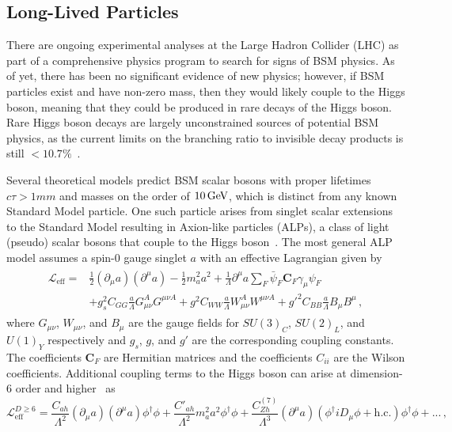 \subsection{Long-Lived Particles} \label{sec:LLPs}
There are ongoing experimental analyses at the Large Hadron Collider (LHC) as part of a comprehensive physics program to search for signs of BSM physics. As of yet, there has been no significant evidence of new physics; however, if BSM particles exist and have non-zero mass, then they would likely couple to the Higgs boson, meaning that they could be produced in rare decays of the Higgs boson. Rare Higgs boson decays are largely unconstrained sources of potential BSM physics, as the current limits on the branching ratio to invisible decay products is still $<10.7\%$~\cite{pdg2024}.

Several theoretical models predict BSM scalar bosons with proper lifetimes $c\tau>1\unit{mm}$ and masses on the order of $10\,\text{Ge\hspace{-.08em}V}$, which is distinct from any known Standard Model particle. One such particle arises from singlet scalar extensions to the Standard Model resulting in Axion-like particles (ALPs), a class of light (pseudo) scalar bosons that couple to the Higgs boson~\cite{atlas_alp}. The most general ALP model assumes a spin-0 gauge singlet $a$ with an effective Lagrangian given by~\cite{alp_colliders}
\begin{align}
	\label{eq:alp_lagrangian}
	\begin{split}
		\mathcal{L}_\text{eff}=&\frac{1}{2}\left(\partial_\mu a\right)\left(\partial^\mu a\right)-\frac{1}{2}m_a^2a^2+\frac{1}{\Lambda}\partial^\mu a\sum_{F}\bar{\psi}_F\mathbf{C}_F\gamma_\mu\psi_F\\
		&+g_s^2C_{GG}\frac{a}{\Lambda}G_{\mu\nu}^AG^{\mu\nu A}+g^2C_{WW}\frac{a}{\Lambda}W_{\mu\nu}^AW^{\mu\nu A}+g'^2C_{BB}\frac{a}{\Lambda}B_\mu B^\mu\,,
	\end{split}
\end{align}
where $G_{\mu\nu}$, $W_{\mu\nu}$, and $B_\mu$ are the gauge fields for $SU(3)_C$, $SU(2)_L$, and $U(1)_Y$ respectively and $g_s$, $g$, and $g'$ are the corresponding coupling constants. The coefficients $\mathbf{C}_F$ are Hermitian matrices and the coefficients $C_{ii}$ are the Wilson coefficients. Additional coupling terms to the Higgs boson can arise at dimension-6 order and higher~\cite{alp_colliders} as
\begin{equation}
	\label{eq:alp_6d_lagrangian}
	\mathcal{L}_\text{eff}^{D\geq6}=\frac{C_{ah}}{\Lambda^2}(\partial_\mu a)(\partial^\mu a)\phi^\dagger\phi+\frac{C'_{ah}}{\Lambda^2}m_a^2a^2\phi^\dagger\phi+\frac{C_{Zh}^{(7)}}{\Lambda^3}(\partial^\mu a)(\phi^\dagger iD_\mu\phi+\text{h.c.})\phi^\dagger\phi+...\,,
\end{equation}
